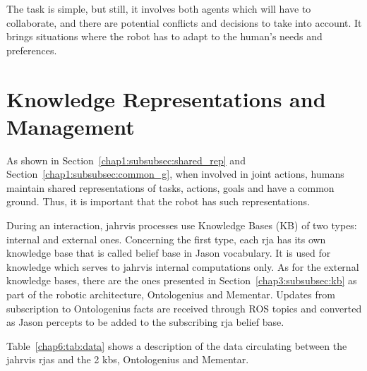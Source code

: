 \documentclass[a4paper,11pt,twoside]{StyleThese}
\begin{document}
The task is simple, but still, it involves both agents which will have to collaborate, and there are potential conflicts and decisions to take into account. It brings situations where the robot has to adapt to the human's needs and preferences.

\section{Knowledge Representations and Management}\label{chap6:sec:know}
As shown in Section~\ref{chap1:subsubsec:shared_rep} and Section~\ref{chap1:subsubsec:common_g}, when involved in joint actions, humans maintain shared representations of tasks, actions, goals and have a common ground. Thus, it is important that the robot has such representations.

During an interaction, \acrshort{jahrvis} processes use Knowledge Bases (KB) of two types: internal and external ones. Concerning the first type, each \acrshort{rja} has its own knowledge base that is called belief base in Jason vocabulary. It is used for knowledge which serves to \acrshort{jahrvis} internal computations only. As for the external knowledge bases, there are the ones presented in Section~\ref{chap3:subsubsec:kb} as part of the robotic architecture, Ontologenius and Mementar. Updates from subscription to Ontologenius facts are received through ROS topics and converted as Jason percepts to be added to the subscribing \acrshort{rja} belief base. 

Table~\ref{chap6:tab:data} shows a description of the data circulating between the \acrshort{jahrvis} \acrshort{rja}s and the 2 \acrlong{kb}s, Ontologenius and Mementar.
\end{document}

